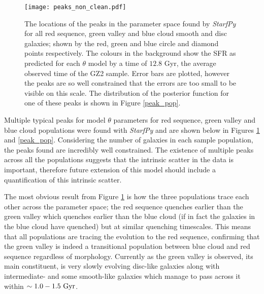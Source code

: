 \documentclass{mn2e}
\begin{document}
\begin{figure}
\texttt{[image: peaks\_non\_clean.pdf]}
\caption{The locations of the peaks in the parameter space found by \emph{StarfPy} for all red sequence, green valley and blue cloud smooth and disc galaxies; shown by the red, green and blue circle and diamond points respectively. The colours in the background show the SFR as predicted for each $\theta$ model by a time of $12.8$ Gyr, the average observed time of the GZ2 sample. Error bars are plotted, however the peaks are so well constrained that the errors are too small to be visible on this scale. The distribution of the posterior function for one of these peaks is shown in Figure \ref{peak_pop}.}
\label{peaks_non}
\end{figure}


Multiple typical peaks for model $\theta$ parameters for red sequence, green valley and blue cloud populations were found with \emph{StarfPy} and are shown below in Figures \ref{peaks_non} and \ref{peak_pop}.  Considering the number of galaxies in each sample population, the peaks found are incredibly well constrained. The existence of multiple peaks across all the populations suggests that the intrinsic scatter in the data is important, therefore future extension of this model should include a quantification of this intrinsic scatter.  

The most obvious result from Figure \ref{peaks_non} is how the three populations trace each other across the parameter space; the red sequence quenches earlier than the green valley which quenches earlier than the blue cloud (if in fact the galaxies in the blue cloud have quenched) but at similar quenching timescales. This means that all populations are tracing the evolution to the red sequence, confirming that the green valley is indeed a transitional population between blue cloud and red sequence regardless of morphology. Currently as the green valley is observed, its main constituent, is very slowly evolving disc-like galaxies along with intermediate- and some smooth-like galaxies which manage to pass across it within $\sim 1.0-1.5~\rm{Gyr}$.
\end{document}
